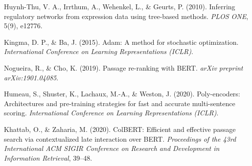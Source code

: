 \documentclass[
  12pt,
]{report}
\begin{document}
Huynh-Thu, V. A., Irrthum, A., Wehenkel, L., \& Geurts, P. (2010).
Inferring regulatory networks from expression data using tree-based
methods. \emph{PLOS ONE}, 5(9), e12776.

Kingma, D. P., \& Ba, J. (2015). Adam: A method for stochastic
optimization. \emph{International Conference on Learning Representations
(ICLR)}.

Nogueira, R., \& Cho, K. (2019). Passage re-ranking with BERT.
\emph{arXiv preprint arXiv:1901.04085}.

Humeau, S., Shuster, K., Lachaux, M.-A., \& Weston, J. (2020).
Poly-encoders: Architectures and pre-training strategies for fast and
accurate multi-sentence scoring. \emph{International Conference on
Learning Representations (ICLR)}.

Khattab, O., \& Zaharia, M. (2020). ColBERT: Efficient and effective
passage search via contextualized late interaction over BERT.
\emph{Proceedings of the 43rd International ACM SIGIR Conference on
Research and Development in Information Retrieval}, 39--48.
\end{document}
